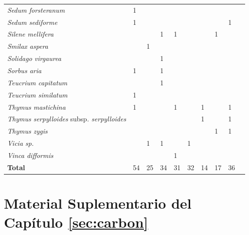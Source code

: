 {\begin{longtable}{llllllllll}
\textit{Sedum forsteranum}  & 1 &  &  &  &  &  &  &  \\
\textit{Sedum sediforme}  & 1 &  &  &  &  &  &  & 1 \\
\textit{Silene mellifera}  &  &  & 1 & 1 &  &  & 1 &  \\
\textit{Smilax aspera}  &  & 1 &  &  &  &  &  &  \\
\textit{Solidago virgaurea}  &  &  & 1 &  &  &  &  &  \\
\textit{Sorbus aria}  & 1 &  & 1 &  &  &  &  &  \\
\textit{Teucrium capitatum}  &  &  & 1 &  &  &  &  &  \\
\textit{Teucrium similatum}  & 1 &  &  &  &  &  &  &  \\
\textit{Thymus mastichina}  & 1 &  &  & 1 &  & 1 &  & 1 \\
\textit{Thymus serpylloides }subsp\textit{. serpylloides}  &  &  &  &  &  & 1 &  & 1 \\
\textit{Thymus zygis}  &  &  &  &  &  &  & 1 & 1 \\
\textit{Vicia sp.}  &  & 1 & 1 &  & 1 &  &  &  \\
\textit{Vinca difformis}  &  &  &  & 1 &  &  &  &  \\ 
\hline
\textbf{Total}  & 54 & 25 & 34 & 31 & 32 & 14 & 17 & 36 \\
\bottomrule
\end{longtable}

}%

\newpage

\chapter{\textcolor{ctcolormain}{Material Suplementario del Capítulo \ref{sec:carbon}}}\label{sec:appendix:carbon}
\newpage


